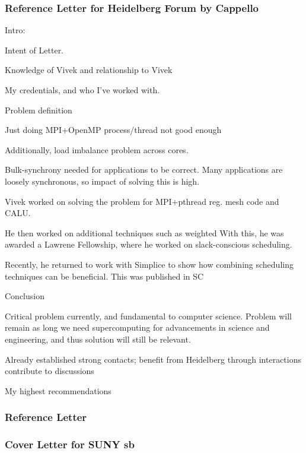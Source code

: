 \begin{frame} 
\frametitle{Reference Letter for Heidelberg Forum by Cappello} 
\begin{outline}[enumerate] 
\tiny \1 {\tiny Intro: } 

\tiny \2 {\tiny Intent of Letter. }

\tiny \2 {\tiny Knowledge of Vivek and relationship to Vivek } 

\tiny \2 {\tiny My credentials, and who I've worked with.} 

\tiny \1 {\tiny Problem definition} 

\tiny \2 {\tiny Just doing MPI+OpenMP process/thread not good enough} 

\tiny \2 {\tiny Additionally, load imbalance problem across cores.} 

\tiny \2 {\tiny Bulk-synchrony needed for applications to be
  correct. }
\tiny \2 {\tiny Many applications are loosely synchronous, so impact
  of solving this is high.}

\tiny \1 { \tiny Vivek worked on solving the problem for MPI+pthread
  reg. mesh code and CALU.  } 

\tiny \1 {\tiny He then worked on additional techniques such as
  weighted } 
\tiny \1 {\tiny With this, he was awarded a Lawrene Fellowship, where
  he worked on slack-conscious scheduling. } 

\tiny \1 {\tiny Recently, he returned to work with Simplice to show
  how combining scheduling techniques can be beneficial. This was
  published in SC} 

\tiny \1 {\tiny Conclusion  }

\tiny \2 {\tiny Critical problem currently, and fundamental to
  computer science.  Problem will remain as long we need supercomputing
  for advancements in science and engineering, and thus solution will
  still be relevant.} 

\tiny \2 {\tiny Already established strong contacts; benefit from
  Heidelberg through interactions contribute to discussions} 

\tiny \2 { My highest recommendations} 
\end{outline} 

\end{frame}

\begin{frame} 
\frametitle{ Reference Letter}
\end{frame} 

\begin{frame} 
\frametitle{Cover Letter for SUNY sb}

\end{frame} 




